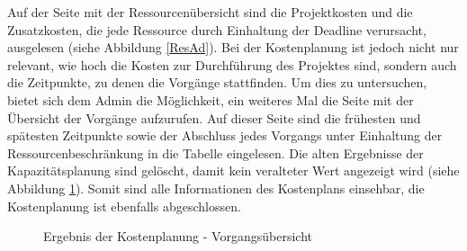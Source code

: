 \documentclass[a4paper,12pt,parskip,bibtotoc,liststotoc]{article}
\begin{document}
Auf der Seite mit der Ressourcenübersicht sind die Projektkosten und die Zusatzkosten, die jede Ressource durch Einhaltung der Deadline verursacht, ausgelesen (siehe Abbildung \ref{ResAd}). Bei der Kostenplanung ist jedoch nicht nur relevant, wie hoch die Kosten zur Durchführung des Projektes sind, sondern auch die Zeitpunkte, zu denen die Vorgänge stattfinden. Um dies zu untersuchen, bietet sich dem Admin die Möglichkeit, ein weiteres Mal die Seite mit der Übersicht der Vorgänge aufzurufen. Auf dieser Seite sind die frühesten und spätesten Zeitpunkte sowie der Abschluss jedes Vorgangs unter Einhaltung der Ressourcenbeschränkung in die Tabelle eingelesen. Die alten Ergebnisse der Kapazitätsplanung sind gelöscht, damit kein veralteter Wert angezeigt wird (siehe Abbildung \ref{VorKo}). Somit sind alle Informationen des Kostenplans einsehbar, die Kostenplanung ist ebenfalls abgeschlossen.\\  

\begin{figure}[h!]
  \begin{center}
    \caption{Ergebnis der Kostenplanung - Vorgangsübersicht}  \label{VorKo}
  \end{center}
\end{figure}
\end{document}
